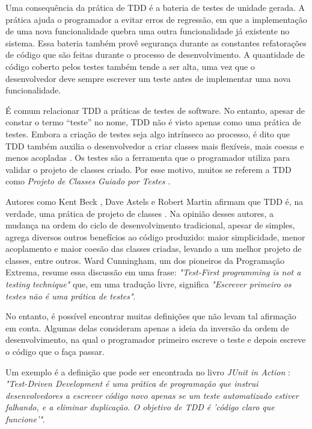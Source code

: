 Uma consequência da prática de TDD é a bateria de testes de unidade gerada.
A prática ajuda o programador a evitar erros de regressão, em que a implementação de
uma nova funcionalidade quebra uma outra funcionalidade já existente no sistema.
Essa bateria também provê segurança durante as
constantes refatorações de código que são feitas durante o processo de
desenvolvimento.
A quantidade de código coberto pelos testes também tende a ser alta, uma vez que o
desenvolvedor deve sempre escrever um teste antes de implementar uma nova
funcionalidade. 

É comum relacionar TDD a práticas de testes de software. No entanto, apesar de constar o
termo ``teste'' no nome, TDD não é visto apenas como uma prática de testes.
Embora a criação de testes seja algo intrínseco ao processo, é dito que TDD também 
auxilia o desenvolvedor a criar classes mais flexíveis, mais coesas e
menos acopladas \cite{aim-fire} \cite{bob-martin} \cite{astels-tdd}. Os testes
são a ferramenta que o programador utiliza para validar o projeto de classes criado. 
Por esse motivo, muitos se referem a TDD como
\textit{Projeto de Classes Guiado por Testes} \cite{tdd-taxonomy}.

Autores como Kent Beck \cite{aim-fire}, Dave Astels \cite{astels-tdd} e
Robert Martin \cite{bob-martin} afirmam que TDD é, na verdade, uma prática de
projeto de classes \cite{tdd-taxonomy} \cite{aim-fire}.
Na opinião desses autores, a mudança na ordem do ciclo de
desenvolvimento tradicional, apesar de simples, agrega diversos outros
benefícios ao código produzido: maior simplicidade, menor acoplamento e maior
coesão das classes criadas, levando a um melhor projeto de classes, entre
outros. Ward Cunningham, um dos pioneiros da Programação Extrema, resume essa 
discussão em uma frase: \textit{"Test-First programming is not a testing technique"} 
que, em uma tradução livre, significa \textit{"Escrever primeiro os testes
não é uma prática de testes"}.

No entanto, é possível encontrar muitas definições que
não levam tal afirmação em conta. Algumas delas consideram apenas a ideia da
inversão da ordem de desenvolvimento, na qual o programador primeiro
escreve o teste e depois escreve o código que o faça passar.

Um exemplo é a definição que pode ser encontrada no livro \textit{JUnit
in Action} \cite{junit-in-action}: \textit{"Test-Driven Development é uma
prática de programação que instrui desenvolvedores a escrever código novo
apenas se um teste automatizado estiver falhando, e a eliminar duplicação. O
objetivo de TDD é 'código claro que funcione'"}.

